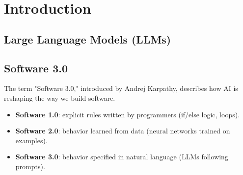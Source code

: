 \section{Introduction}

\subsection{Large Language Models (LLMs)}

\subsection{Software 3.0}
The term "Software 3.0," introduced by Andrej Karpathy, describes how AI is reshaping the way we build software.
\begin{itemize}
    \item \textbf{Software 1.0}: explicit rules written by programmers (if/else logic, loops).
    \item \textbf{Software 2.0}: behavior learned from data (neural networks trained on examples).
    \item \textbf{Software 3.0}: behavior specified in natural language (LLMs following prompts).
\end{itemize}

